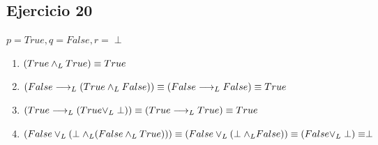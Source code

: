 	\subsection{Ejercicio 20}
		$p=True, q=False, r=\perp$
		\begin{enumerate}[label=(\alph*)]
		\item $(True \land _L True) \equiv True$
		\item $(False \longrightarrow _L (True \land _L False)) \equiv (False \longrightarrow _L False) \equiv True$
		\item $(True \longrightarrow _L (True \lor _L \perp)) \equiv (True \longrightarrow _L True)  \equiv True$
		\item $(False \lor _L (\perp \land _L (False \land _L True))) \equiv (False \lor _L (\perp \land _L False)) \equiv (False \lor _L \perp) \equiv \perp$
		\end{enumerate}

